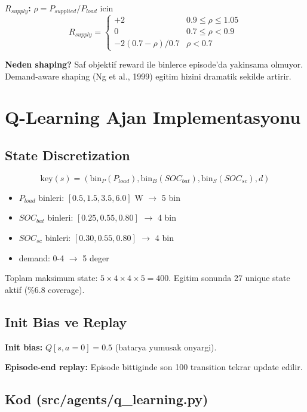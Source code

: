 \documentclass[11pt,a4paper]{article}
\begin{document}
\textbf{$R_{supply}$:} $\rho = P_{supplied}/P_{load}$ icin
\[
R_{supply} = \begin{cases}
+2 & 0.9 \leq \rho \leq 1.05 \\
0 & 0.7 \leq \rho < 0.9 \\
-2(0.7 - \rho)/0.7 & \rho < 0.7
\end{cases}
\]

\begin{whybox}
\textbf{Neden shaping?} Saf objektif reward ile binlerce episode'da yakinsama olmuyor. Demand-aware shaping (Ng et al., 1999) egitim hizini dramatik sekilde artirir.
\end{whybox}

\section{Q-Learning Ajan Implementasyonu}

\subsection{State Discretization}

\[
\text{key}(s) = (\text{bin}_P(P_{load}), \text{bin}_B(SOC_{bat}), \text{bin}_S(SOC_{sc}), d)
\]

\begin{itemize}
  \item $P_{load}$ binleri: $[0.5, 1.5, 3.5, 6.0]$ W $\to$ 5 bin
  \item $SOC_{bat}$ binleri: $[0.25, 0.55, 0.80]$ $\to$ 4 bin
  \item $SOC_{sc}$ binleri: $[0.30, 0.55, 0.80]$ $\to$ 4 bin
  \item demand: 0-4 $\to$ 5 deger
\end{itemize}

Toplam maksimum state: $5 \times 4 \times 4 \times 5 = 400$. Egitim sonunda 27 unique state aktif (\%6.8 coverage).

\subsection{Init Bias ve Replay}

\textbf{Init bias:} $Q[s, a=0] = 0.5$ (batarya yumusak onyargi).

\textbf{Episode-end replay:} Episode bittiginde son 100 transition tekrar update edilir.

\subsection{Kod (src/agents/q\_learning.py)}
\end{document}
